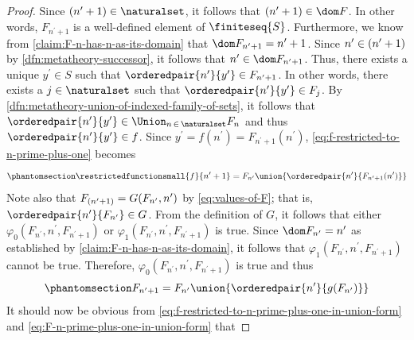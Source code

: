 \begin{proof}
    Since \( \mleft( n^{\prime} + 1 \mright) \in \naturalset \), it follows that \( \mleft( n^{\prime} + 1 \mright) \in \dom F \).
    In other words, \( F_{n^{\prime} + 1} \) is a well-defined element of \( \finiteseq{S} \).
    Furthermore, we know from \cref{claim:F-n-has-n-as-its-domain} that \( \dom F_{n^{\prime} + 1} = n^{\prime} + 1 \).
    Since \( n^{\prime} \in \mleft( n^{\prime} + 1 \mright) \) by \cref{dfn:metatheory-successor}, it follows that \( n^{\prime} \in \dom F_{n^{\prime} + 1} \).
    Thus, there exists a unique \( y^{\prime} \in S \) such that \( \orderedpair{n^{\prime}}{y^{\prime}} \in F_{n^{\prime} + 1} \).
    In other words, there exists a \( j \in \naturalset \) such that \( \orderedpair{n^{\prime}}{y^{\prime}} \in F_{j} \).
    By \cref{dfn:metatheory-union-of-indexed-family-of-sets}, it follows that
    \( \orderedpair{n^{\prime}}{y^{\prime}} \in \Union_{n \,\in\, \naturalset} F_{n} \) and thus \( \orderedpair{n^{\prime}}{y^{\prime}} \in f \).
    Since \( y^{\prime} = f(n^{\prime}) = F_{n^{\prime} + 1}(n^{\prime}) \),
    \eqref{eq:f-restricted-to-n-prime-plus-one} becomes
    \begin{equation}
        \phantomsection \label{eq:f-restricted-to-n-prime-plus-one-in-union-form}
        \restrictedfunctionsmall{f}{n^{\prime} + 1} = F_{n^{\prime}} \union \mleft\{ \orderedpair{n^{\prime}}{F_{n^{\prime} + 1}(n^{\prime})} \mright\}
    \end{equation}
    Note also that \( F_{\mleft( n^{\prime} + 1 \mright)} = G(F_{n^{\prime}}, n^{\prime}) \) by \eqref{eq:values-of-F};
    that is, \( \orderedpair{n^{\prime}}{F_{n^{\prime}}} \in G \).
    From the definition of \( G \), it follows that either \( \varphi_{0}(F_{n^{\prime}}, n^{\prime}, F_{n^{\prime} + 1}) \)
    or \(  \varphi_{1}(F_{n^{\prime}}, n^{\prime}, F_{n^{\prime} + 1}) \) is true.
    Since \( \dom F_{n^{\prime}} = n^{\prime} \) as established by \cref{claim:F-n-has-n-as-its-domain}, it follows that
    \( \varphi_{1}(F_{n^{\prime}}, n^{\prime}, F_{n^{\prime} + 1}) \) cannot be true.
    Therefore, \( \varphi_{0}(F_{n^{\prime}}, n^{\prime}, F_{n^{\prime} + 1}) \) is true and thus
    \begin{equation}
        \phantomsection \label{eq:F-n-prime-plus-one-in-union-form}
        F_{n^{\prime} + 1} = F_{n^{\prime}} \union \mleft\{ \orderedpair{n^{\prime}}{g(F_{n^{\prime}})} \mright\}
    \end{equation}
    It should now be obvious from \eqref{eq:f-restricted-to-n-prime-plus-one-in-union-form} and \eqref{eq:F-n-prime-plus-one-in-union-form} that

\end{proof}
